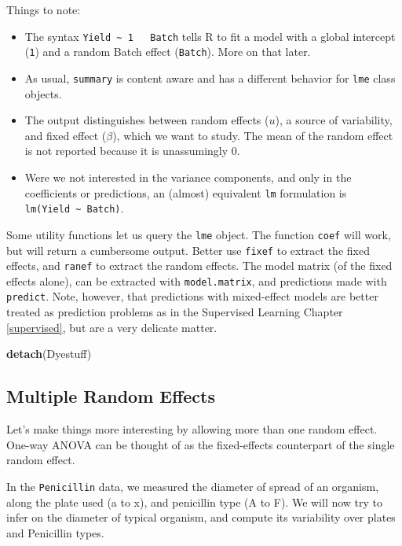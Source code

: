 \documentclass[]{book}
\newenvironment{Shaded}{\begin{snugshade}}{\end{snugshade}}
\newcommand{\KeywordTok}[1]{\textcolor[rgb]{0.13,0.29,0.53}{\textbf{#1}}}
\newcommand{\NormalTok}[1]{#1}
\providecommand{\tightlist}{%
  \setlength{\itemsep}{0pt}\setlength{\parskip}{0pt}}
\theoremstyle{definition}
\theoremstyle{definition}
\theoremstyle{definition}
\theoremstyle{remark}
\begin{document}
Things to note:

\begin{itemize}
\tightlist
\item
  The syntax \texttt{Yield\ \textasciitilde{}\ 1\ \ \textbar{}\ Batch}
  tells R to fit a model with a global intercept (\texttt{1}) and a
  random Batch effect (\texttt{\textbar{}Batch}). More on that later.
\item
  As usual, \texttt{summary} is content aware and has a different
  behavior for \texttt{lme} class objects.
\item
  The output distinguishes between random effects (\(u\)), a source of
  variability, and fixed effect (\(\beta\)), which we want to study. The
  mean of the random effect is not reported because it is unassumingly
  0.
\item
  Were we not interested in the variance components, and only in the
  coefficients or predictions, an (almost) equivalent \texttt{lm}
  formulation is \texttt{lm(Yield\ \textasciitilde{}\ Batch)}.
\end{itemize}

Some utility functions let us query the \texttt{lme} object. The
function \texttt{coef} will work, but will return a cumbersome output.
Better use \texttt{fixef} to extract the fixed effects, and
\texttt{ranef} to extract the random effects. The model matrix (of the
fixed effects alone), can be extracted with \texttt{model.matrix}, and
predictions made with \texttt{predict}. Note, however, that predictions
with mixed-effect models are better treated as prediction problems as in
the Supervised Learning Chapter \ref{supervised}, but are a very
delicate matter.

\begin{Shaded}
\begin{Highlighting}[]
\KeywordTok{detach}\NormalTok{(Dyestuff)}
\end{Highlighting}
\end{Shaded}

\subsection{Multiple Random Effects}\label{multiple-random-effects}

Let's make things more interesting by allowing more than one random
effect. One-way ANOVA can be thought of as the fixed-effects counterpart
of the single random effect.

In the \texttt{Penicillin} data, we measured the diameter of spread of
an organism, along the plate used (a to x), and penicillin type (A to
F). We will now try to infer on the diameter of typical organism, and
compute its variability over plates and Penicillin types.
\end{document}
